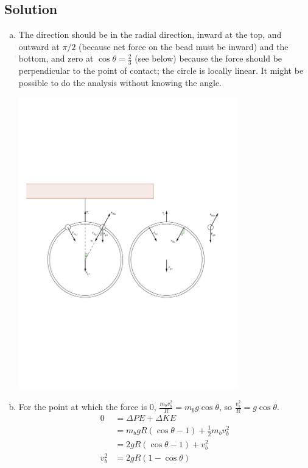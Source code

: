 \documentclass[solutions]{esg8012pset}
\begin{document}
\subsection*{Solution}
\begin{enumerate}[a)]
 \item The direction should be in the radial direction, inward at the top, and outward at $\pi/2$ (because net force on the bead must be inward) and the bottom, and zero at $\cos\theta = \frac{2}{3}$ (see below) because the force should be perpendicular to the point of contact; the circle is locally linear.  It might be possible to do the analysis without knowing the angle. \par
 \begin{center}\includegraphics[width=0.75\textwidth]{2009-10-23_Diagram_7_1}\end{center}
 \item For the point at which the force is 0, $\frac{m_b v_b^2}{R} = m_b g\cos\theta$, so $\frac{v_b^2}{R} = g\cos\theta$.
   \begin{align*}
     0 & = \Delta PE + \Delta KE \\
       & = m_b g R(\cos\theta - 1) + \frac{1}{2}m_b v_b^2 \\
       & = 2 g R (\cos\theta - 1) + v_b^2 \\
     v_b^2 & = 2 g R(1 - \cos\theta) \\

\end{align*}
\end{enumerate}
\end{document}
